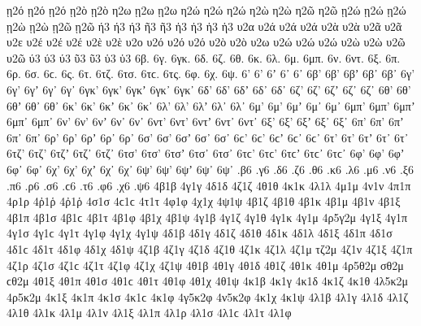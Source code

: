 {ῃ2ό ῃ2ό ῃ2ό 
ῃ2ὸ ῃ2ὸ 
η2ω 
ῃ2ω ῃ2ω 
η2ώ η2ώ η2ώ 
η2ὼ η2ὼ 
η2ῶ η2ῶ 
ῃ2ώ ῃ2ώ ῃ2ώ 
ῃ2ὼ ῃ2ὼ 
ῃ2ῶ ῃ2ῶ 
ή3 ή3 ή3 
ῆ3 ῆ3 
ἠ3 ἠ3 
ἡ3 ἡ3 
υ2α 
υ2ά υ2ά υ2ά 
υ2ὰ υ2ὰ 
υ2ᾶ υ2ᾶ 
υ2ε 
υ2έ υ2έ υ2έ 
υ2ὲ υ2ὲ 
υ2ο 
υ2ό υ2ό υ2ό 
υ2ὸ υ2ὸ 
υ2ω 
υ2ώ υ2ώ υ2ώ 
υ2ὼ υ2ὼ 
υ2ῶ υ2ῶ 
ύ3 ύ3 ύ3 
ῦ3 ῦ3 
ὑ3 ὑ3 
6β. 
6γ. 
6γκ. 
6δ. 
6ζ. 
6θ. 
6κ. 
6λ. 
6μ. 
6μπ. 
6ν. 
6ντ. 
6ξ. 
6π. 
6ρ. 
6σ. 6ϲ. 
6ς. 
6τ. 
6τζ. 
6τσ. 6τϲ. 
6τς. 
6φ. 
6χ. 
6ψ. 
6' 6’ 6ʼ 6᾽ 6᾿ 
6β' 6β’ 6βʼ 6β᾽ 6β᾿ 
6γ' 6γ’ 6γʼ 6γ᾽ 6γ᾿ 
6γκ' 6γκ’ 6γκʼ 6γκ᾽ 6γκ᾿ 
6δ' 6δ’ 6δʼ 6δ᾽ 6δ᾿ 
6ζ' 6ζ’ 6ζʼ 6ζ᾽ 6ζ᾿ 
6θ' 6θ’ 6θʼ 6θ᾽ 6θ᾿ 
6κ' 6κ’ 6κʼ 6κ᾽ 6κ᾿ 
6λ' 6λ’ 6λʼ 6λ᾽ 6λ᾿ 
6μ' 6μ’ 6μʼ 6μ᾽ 6μ᾿ 
6μπ' 6μπ’ 6μπʼ 6μπ᾽ 6μπ᾿ 
6ν' 6ν’ 6νʼ 6ν᾽ 6ν᾿ 
6ντ' 6ντ’ 6ντʼ 6ντ᾽ 6ντ᾿ 
6ξ' 6ξ’ 6ξʼ 6ξ᾽ 6ξ᾿ 
6π' 6π’ 6πʼ 6π᾽ 6π᾿ 
6ρ' 6ρ’ 6ρʼ 6ρ᾽ 6ρ᾿ 
6σ' 6σ’ 6σʼ 6σ᾽ 6σ᾿ 6ϲ' 6ϲ’ 6ϲʼ 6ϲ᾽ 6ϲ᾿ 
6τ' 6τ’ 6τʼ 6τ᾽ 6τ᾿ 
6τζ' 6τζ’ 6τζʼ 6τζ᾽ 6τζ᾿ 
6τσ' 6τσ’ 6τσʼ 6τσ᾽ 6τσ᾿ 6τϲ' 6τϲ’ 6τϲʼ 6τϲ᾽ 6τϲ᾿ 
6φ' 6φ’ 6φʼ 6φ᾽ 6φ᾿ 
6χ' 6χ’ 6χʼ 6χ᾽ 6χ᾿ 
6ψ' 6ψ’ 6ψʼ 6ψ᾽ 6ψ᾿ 
.β6 
.γ6 
.δ6 
.ζ6 
.θ6 
.κ6 
.λ6 
.μ6 
.ν6 
.ξ6 
.π6 
.ρ6 
.σ6 .ϲ6 
.τ6 
.φ6 
.χ6 
.ψ6 
4β1β 
4γ1γ 
4δ1δ 
4ζ1ζ 
4θ1θ 
4κ1κ 
4λ1λ 
4μ1μ 
4ν1ν 
4π1π 
4ρ1ρ 
4ῤ1ῥ 4ῤ1ῥ 
4σ1σ 4ϲ1ϲ 
4τ1τ 
4φ1φ 
4χ1χ 
4ψ1ψ 
4β1ζ 
4β1θ 
4β1κ 
4β1μ 
4β1ν 
4β1ξ 
4β1π 
4β1σ 4β1ϲ 
4β1τ 
4β1φ 
4β1χ 
4β1ψ 
4γ1β 
4γ1ζ 
4γ1θ 
4γ1κ 
4γ1μ 
4ρ5γ2μ   %
4γ1ξ 
4γ1π 
4γ1σ 4γ1ϲ 
4γ1τ 
4γ1φ 
4γ1χ 
4γ1ψ 
4δ1β 
4δ1γ 
4δ1ζ 
4δ1θ 
4δ1κ 
4δ1λ 
4δ1ξ 
4δ1π 
4δ1σ 4δ1ϲ 
4δ1τ 
4δ1φ 
4δ1χ 
4δ1ψ 
4ζ1β   %
4ζ1γ   %
4ζ1δ 
4ζ1θ 
4ζ1κ 
4ζ1λ 
4ζ1μ 
τζ2μ   %
4ζ1ν 
4ζ1ξ 
4ζ1π 
4ζ1ρ 
4ζ1σ 4ζ1ϲ 
4ζ1τ 
4ζ1φ 
4ζ1χ 
4ζ1ψ 
4θ1β 
4θ1γ 
4θ1δ 
4θ1ζ 
4θ1κ 
4θ1μ 
4ρ5θ2μ   %
σθ2μ ϲθ2μ   %
4θ1ξ 
4θ1π 
4θ1σ 4θ1ϲ 
4θ1τ 
4θ1φ 
4θ1χ 
4θ1ψ 
4κ1β   %
4κ1γ 
4κ1δ 
4κ1ζ 
4κ1θ 
4λ5κ2μ   %
4ρ5κ2μ   %
4κ1ξ 
4κ1π 
4κ1σ 4κ1ϲ 
4κ1φ 
4γ5κ2φ   %
4ν5κ2φ   %
4κ1χ 
4κ1ψ 
4λ1β 
4λ1γ 
4λ1δ 
4λ1ζ 
4λ1θ 
4λ1κ 
4λ1μ 
4λ1ν 
4λ1ξ 
4λ1π 
4λ1ρ 
4λ1σ 4λ1ϲ 
4λ1τ 
4λ1φ 
}
